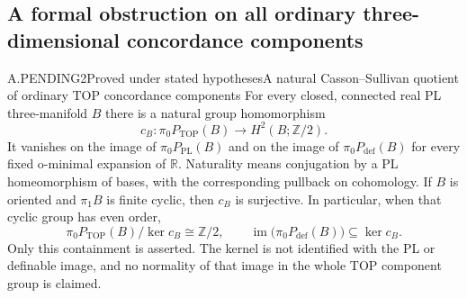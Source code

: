 \subsection{A formal obstruction on all ordinary three-dimensional concordance components}

\begin{saresult}{A.PENDING2}{Proved under stated hypotheses}{A natural Casson--Sullivan quotient of ordinary TOP concordance components}
For every closed, connected real PL three-manifold $B$ there is a
natural group homomorphism
\[
 c_B:\pi_0P_{\mathrm{TOP}}(B)\longrightarrow H^2(B;\mathbb Z/2).
                                                        \tag{C3.1}
\]
It vanishes on the image of $\pi_0P_{\mathrm{PL}}(B)$ and on the image
of $\pi_0P_{\mathrm{def}}(B)$ for every fixed o-minimal expansion of
$\mathbb R$. Naturality means conjugation by a PL homeomorphism of
bases, with the corresponding pullback on cohomology. If $B$ is
oriented and $\pi_1B$ is finite cyclic, then $c_B$ is surjective.
In particular, when that cyclic group has even order,
\[
 \pi_0P_{\mathrm{TOP}}(B)/\ker c_B\cong\mathbb Z/2,
 \qquad
 \operatorname{im}\bigl(\pi_0P_{\mathrm{def}}(B)\bigr)
       \subseteq\ker c_B.
                                                        \tag{C3.2}
\]
Only this containment is asserted. The kernel is not identified with
the PL or definable image, and no normality of that image in the whole
TOP component group is claimed.
\end{saresult}
